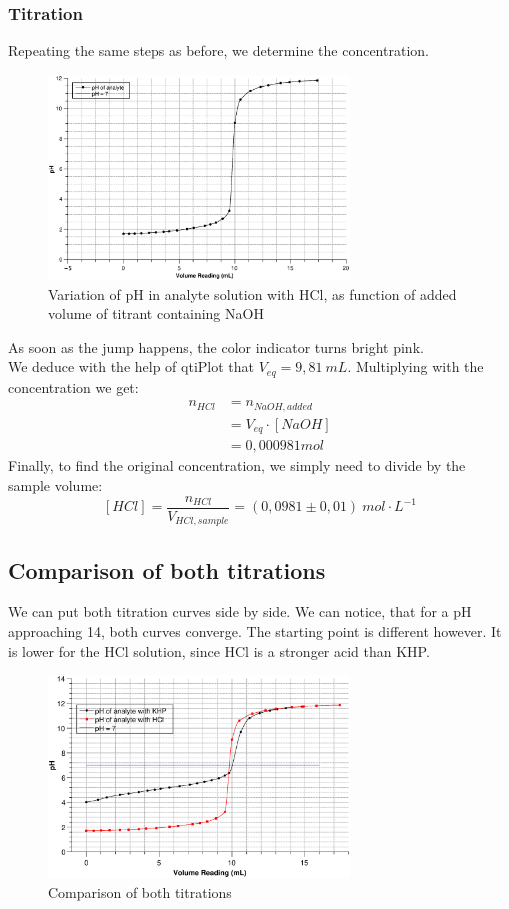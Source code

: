 \documentclass[twocolumn]{article}
\begin{document}
\subsubsection{Titration}
Repeating the same steps as before, we determine the concentration.    \begin{figure}[!htbp]
    \centering
    \includegraphics[width=8cm]{Titration2.eps}
    \caption{Variation of pH in analyte solution with HCl, as function of added volume of titrant containing NaOH}
    \label{fig:3}
    \end{figure}
\FloatBarrier
As soon as the jump happens, the color indicator turns bright pink. \\
We deduce with the help of qtiPlot that $V_{eq} = 9,81 \ mL$. Multiplying with the concentration we get:
\begin{align}
    n_{HCl} &= n_{NaOH,added} \nonumber \\
    &=V_{eq} \cdot [NaOH] \nonumber \\
    &= 0,000981 mol \nonumber
\end{align}
Finally, to find the original concentration, we simply need to divide by the sample volume:
\[ [HCl] = \frac{n_{HCl}}{V_{HCl,sample}} = (0,0981 \pm 0,01) \ mol \cdot L^{-1} \]
\subsection{Comparison of both titrations}
We can put both titration curves side by side. We can notice, that for a pH approaching 14, both curves converge. The starting point is different however. It is lower for the HCl solution, since HCl is a stronger acid than KHP.
\begin{figure}
    \centering
    \includegraphics[width=8cm]{Titration1+2.eps}
    \caption{Comparison of both titrations}
    \label{fig:4}
\end{figure}
\FloatBarrier
\end{document}
